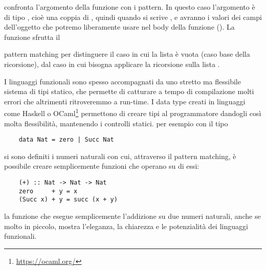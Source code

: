  confronta l'argomento della funzione con i pattern. In questo caso l'argomento è di tipo , cioè
una coppia di , quindi quando si scrive ,  e  avranno i valori dei campi dell'oggetto 
che potremo liberamente usare nel body della funzione ().
La funzione  sfrutta il {pattern matching per distinguere il caso in cui la lista è vuota  (caso base della ricorsione), dal caso in cui
bisogna applicare la ricorsione sulla lista . 

I linguaggi funzionali sono spesso accompagnati da uno stretto ma flessibile sistema di tipi statico, che permette di catturare a tempo di compilazione molti errori che altrimenti ritroveremmo a run-time. I data type creati in linguaggi come Haskell o OCaml\footnote{\url{https://ocaml.org/}}
permettono di creare tipi al programmatore dandogli così molta flessibilità, mantenendo i controlli statici. per esempio con il tipo 
\begin{verbatim}
	data Nat = zero | Succ Nat
\end{verbatim}
si sono definiti i numeri naturali con cui, attraverso il pattern matching, è possibile creare semplicemente funzioni che operano su di essi:
\begin{verbatim}
	(+) :: Nat -> Nat -> Nat
	zero     + y = x
	(Succ x) + y = succ (x + y) 
\end{verbatim}
la funzione \code{(+)} che esegue semplicemente l'addizione su due numeri naturali, anche se molto in piccolo, mostra l'eleganza, la chiarezza e le potenzialità dei linguaggi funzionali.

}

